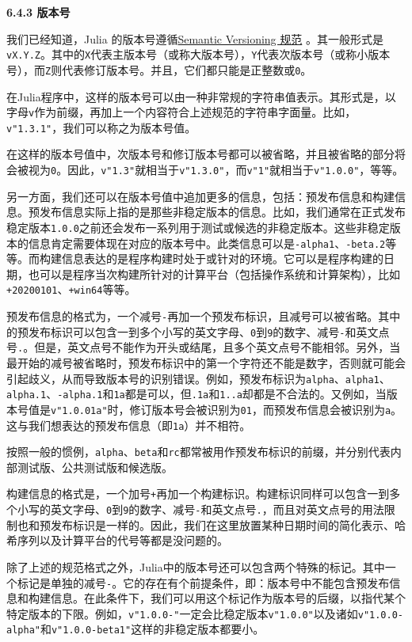 \textbf{6.4.3 版本号}

我们已经知道，Julia 的版本号遵循\href{https://semver.org}{Semantic Versioning 规范} 。其一般形式是\verb|vX.Y.Z|。其中的\verb|X|代表主版本号（或称大版本号），\verb|Y|代表次版本号（或称小版本号），而\verb|Z|则代表修订版本号。并且，它们都只能是正整数或\verb|0|。

在Julia程序中，这样的版本号可以由一种非常规的字符串值表示。其形式是，以字母\verb|v|作为前缀，再加上一个内容符合上述规范的字符串字面量。比如，\verb|v"1.3.1"|，我们可以称之为版本号值。

在这样的版本号值中，次版本号和修订版本号都可以被省略，并且被省略的部分将会被视为\verb|0|。因此，\verb|v"1.3"|就相当于\verb|v"1.3.0"|，而\verb|v"1"|就相当于\verb|v"1.0.0"|，等等。

另一方面，我们还可以在版本号值中追加更多的信息，包括：预发布信息和构建信息。预发布信息实际上指的是那些非稳定版本的信息。比如，我们通常在正式发布稳定版本\verb|1.0.0|之前还会发布一系列用于测试或候选的非稳定版本。这些非稳定版本的信息肯定需要体现在对应的版本号中。此类信息可以是\verb|-alpha1|、\verb|-beta.2|等等。而构建信息表达的是程序构建时处于或针对的环境。它可以是程序构建的日期，也可以是程序当次构建所针对的计算平台（包括操作系统和计算架构），比如\verb|+20200101|、\verb|+win64|等等。

预发布信息的格式为，一个减号\verb|-|再加一个预发布标识，且减号可以被省略。其中的预发布标识可以包含一到多个小写的英文字母、\verb|0|到\verb|9|的数字、减号\verb|-|和英文点号\verb|.|。但是，英文点号不能作为开头或结尾，且多个英文点号不能相邻。另外，当最开始的减号被省略时，预发布标识中的第一个字符还不能是数字，否则就可能会引起歧义，从而导致版本号的识别错误。例如，预发布标识为\verb|alpha|、\verb|alpha1|、\verb|alpha.1|、\verb|-alpha.1|和\verb|1a|都是可以，但\verb|.1a|和\verb|1..a|却都是不合法的。又例如，当版本号值是\verb|v"1.0.01a"|时，修订版本号会被识别为\verb|01|，而预发布信息会被识别为\verb|a|。这与我们想表达的预发布信息（即\verb|1a|）并不相符。

按照一般的惯例，\verb|alpha|、\verb|beta|和\verb|rc|都常被用作预发布标识的前缀，并分别代表内部测试版、公共测试版和候选版。

构建信息的格式是，一个加号\verb|+|再加一个构建标识。构建标识同样可以包含一到多个小写的英文字母、\verb|0|到\verb|9|的数字、减号\verb|-|和英文点号\verb|.|，而且对英文点号的用法限制也和预发布标识是一样的。因此，我们在这里放置某种日期时间的简化表示、哈希序列以及计算平台的代号等都是没问题的。

除了上述的规范格式之外，Julia中的版本号还可以包含两个特殊的标记。其中一个标记是单独的减号\verb|-|。它的存在有个前提条件，即：版本号中不能包含预发布信息和构建信息。在此条件下，我们可以用这个标记作为版本号的后缀，以指代某个特定版本的下限。例如，\verb|v"1.0.0-"|一定会比稳定版本\verb|v"1.0.0"|以及诸如\verb|v"1.0.0-alpha"|和\verb|v"1.0.0-beta1"|这样的非稳定版本都要小。

